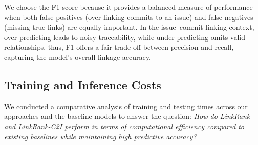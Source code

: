 We choose the F1-score because it provides a balanced measure of performance when both false positives (over-linking commits to an issue) and false negatives (missing true links) are equally important. In the issue--commit linking context, over-predicting leads to noisy traceability, while under-predicting omits valid relationships, thus, F1 offers a fair trade-off between precision and recall, capturing the model’s overall linkage accuracy.







\subsection{Training and Inference Costs}

We conducted a comparative analysis of training and testing times across our approaches and the baseline models to answer the question:
\emph{How do LinkRank and LinkRank-C2I perform in terms of computational efficiency compared to existing baselines while maintaining high predictive accuracy?}\\

